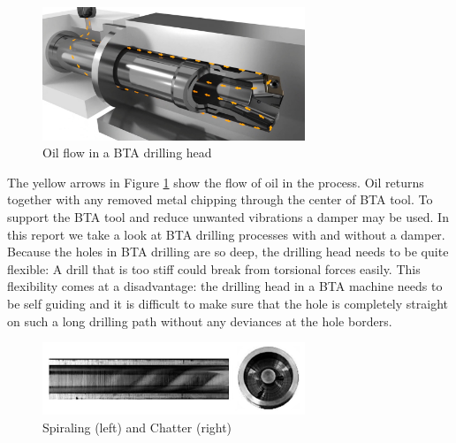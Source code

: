 \documentclass[12 pt]{scrartcl}
\begin{document}
\begin{figure}[ht]
  \centering
  \includegraphics[width=0.7\textwidth]{../images/drillhead.jpg}
  \caption{Oil flow in a BTA drilling head \citep{botek2023}}
  \label{fig:drillhead}
\end{figure}

The yellow arrows in Figure \ref{fig:drillhead} show the flow of oil in the process. Oil returns together with any removed metal chipping through the center of BTA tool.
To support the BTA tool and reduce unwanted vibrations a damper may be used. In this report we take a look at BTA drilling processes with and without a damper.
Because the holes in BTA drilling are so deep, the drilling head needs to be quite flexible: A drill that is too stiff could break from torsional forces easily. This flexibility comes at a disadvantage: the drilling head in a BTA machine needs to be self guiding and it is difficult to make sure that the hole is completely straight on such a long drilling path without any deviances at the hole borders.

\begin{figure}[ht]
  \centering
  \includegraphics[width=0.7\textwidth]{../images/chatterspiral.jpg}
  \caption{Spiraling (left) and Chatter (right) \citep[p.~746]{raabe2010dynamic}}
  \label{fig:chatterspiral}
\end{figure}
\end{document}
